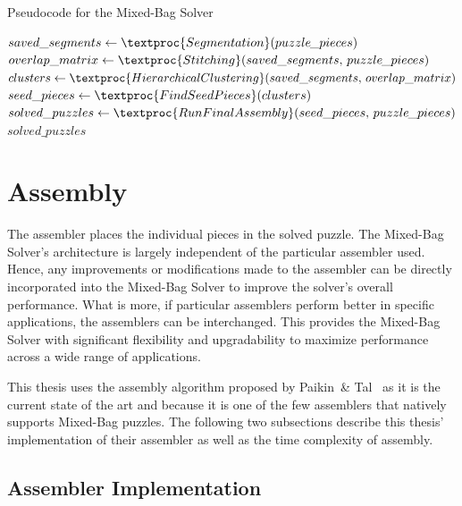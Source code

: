 \begin{algorithm}[tb]
\caption{Pseudocode for the Mixed-Bag Solver}\label{alg:mixedBagSolver}
\begin{algorithmic}[1]
    \State $saved\_segments \gets \textproc{Segmentation}\text{(} puzzle\hspace{-0.8pt}\_pieces \text{)}$
	\State $overlap\_matrix \gets \textproc{Stitching}\text{(} saved\_segments \text{, } puzzle\hspace{-0.8pt}\_pieces \text{)}$
	\State $clusters \gets \textproc{HierarchicalClustering} \text{(}saved\_segments \text{, } overlap\_matrix \text{)}$
	\State $seed\_pieces \gets \textproc{FindSeedPieces} \text{(} clusters \text{)}$
	\State $solved\_puzzles \gets \textproc{RunFinalAssembly} \text{(} seed\_pieces \text{, } puzzle\hspace{-0.8pt}\_pieces \text{)}$
    \State \Return $solved\_puzzles$
\EndFunction
\end{algorithmic}
\end{algorithm}

\section{Assembly}\label{sec:SolverAssembler}

The assembler places the individual pieces in the solved puzzle.  The Mixed-Bag Solver's architecture is largely independent of the particular assembler used.  Hence, any improvements or modifications made to the assembler can be directly incorporated into the Mixed-Bag Solver to improve the solver's overall performance.  What is more, if particular assemblers perform better in specific applications, the assemblers can be interchanged.  This provides the Mixed-Bag Solver with significant flexibility and upgradability to maximize performance across a wide range of applications.

This thesis uses the assembly algorithm proposed by Paikin~\& Tal~\cite{paikin2015} as it is the current state of the art and because it is one of the few assemblers that natively supports Mixed-Bag puzzles.  The following two subsections describe this thesis' implementation of their assembler as well as the time complexity of assembly.

\subsection{Assembler Implementation}\label{sec:assemblerImplementation}

